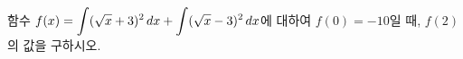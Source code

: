 함수 $f(x)=\displaystyle\int (\sqrt{x}+3)^2\mkern3mu dx+\int (\sqrt{x}-3)^2\mkern3mu dx$에 대하여 $f(0)=-10$일 때, $f(2)$의 값을 구하시오.
